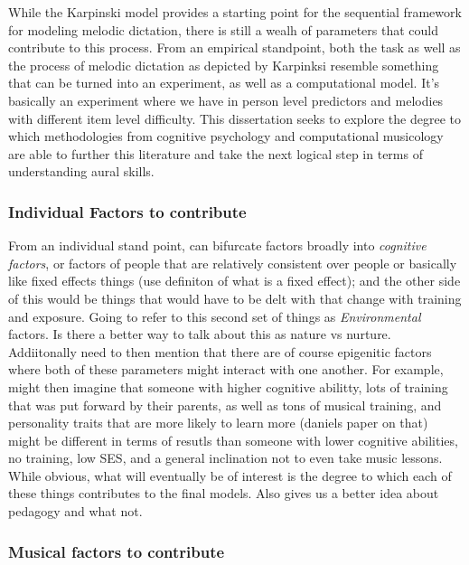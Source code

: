\documentclass[]{book}
\theoremstyle{definition}
\theoremstyle{definition}
\theoremstyle{definition}
\theoremstyle{remark}
\begin{document}
While the Karpinski model provides a starting point for the sequential
framework for modeling melodic dictation, there is still a wealh of
parameters that could contribute to this process. From an empirical
standpoint, both the task as well as the process of melodic dictation as
depicted by Karpinksi resemble something that can be turned into an
experiment, as well as a computational model. It's basically an
experiment where we have in person level predictors and melodies with
different item level difficulty. This dissertation seeks to explore the
degree to which methodologies from cognitive psychology and
computational musicology are able to further this literature and take
the next logical step in terms of understanding aural skills.

\hypertarget{individual-factors-to-contribute}{%
\subsubsection{Individual Factors to
contribute}\label{individual-factors-to-contribute}}

From an individual stand point, can bifurcate factors broadly into
\emph{cognitive factors}, or factors of people that are relatively
consistent over people or basically like fixed effects things (use
definiton of what is a fixed effect); and the other side of this would
be things that would have to be delt with that change with training and
exposure. Going to refer to this second set of things as
\emph{Environmental} factors. Is there a better way to talk about this
as nature vs nurture. Addiitonally need to then mention that there are
of course epigenitic factors where both of these parameters might
interact with one another. For example, might then imagine that someone
with higher cognitive abilitty, lots of training that was put forward by
their parents, as well as tons of musical training, and personality
traits that are more likely to learn more (daniels paper on that) might
be different in terms of resutls than someone with lower cognitive
abilities, no training, low SES, and a general inclination not to even
take music lessons. While obvious, what will eventually be of interest
is the degree to which each of these things contributes to the final
models. Also gives us a better idea about pedagogy and what not.

\hypertarget{musical-factors-to-contribute}{%
\subsubsection{Musical factors to
contribute}\label{musical-factors-to-contribute}}
\end{document}
